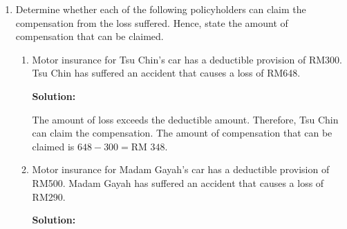 \documentclass{report}
\newcommand{\sol}{

    \vspace{0.5em}\textbf{Solution:}\vspace{0.5em}}
\begin{document}
\begin{enumerate}
\begin{enumerate}
              \item Third party \sol{}

                    According to the premium rate table under the Motor Tariff, the basic premium
                    is RM 75.60.
                    \begin{align*}
                        \text{NCD 45\%}      & = \frac{45}{100} \times 75.60 \\
                                             & = \text{RM } 34.02            \\
                        \text{Gross premium} & = 75.60 - 34.02               \\
                                             & = \text{RM } 41.58
                    \end{align*}

              \item Third party, fire and theft \sol{}
                    \begin{align*}
                        \text{Gross premium} & = \text{75\% of comprehensive policy's gross premium} \\
                                             & = \frac{75}{100} \times 690.42                        \\
                                             & = \text{RM } 517.82
                    \end{align*}
          \end{enumerate}

    \item Determine whether each of the following policyholders can claim the
          compensation from the loss suffered. Hence, state the amount of compensation
          that can be claimed.
          \begin{enumerate}
              \item Motor insurance for Tsu Chin's car has a deductible provision of RM300. Tsu
                    Chin has suffered an accident that causes a loss of RM648. \sol{}

                    The amount of loss exceeds the deductible amount. Therefore, Tsu Chin can claim
                    the compensation. The amount of compensation that can be claimed is $648 - 300
                        = \text{RM } 348$.

              \item Motor insurance for Madam Gayah's car has a deductible provision of RM500.
                    Madam Gayah has suffered an accident that causes a loss of RM290. \sol{}


\end{enumerate}
\end{enumerate}
\end{document}
